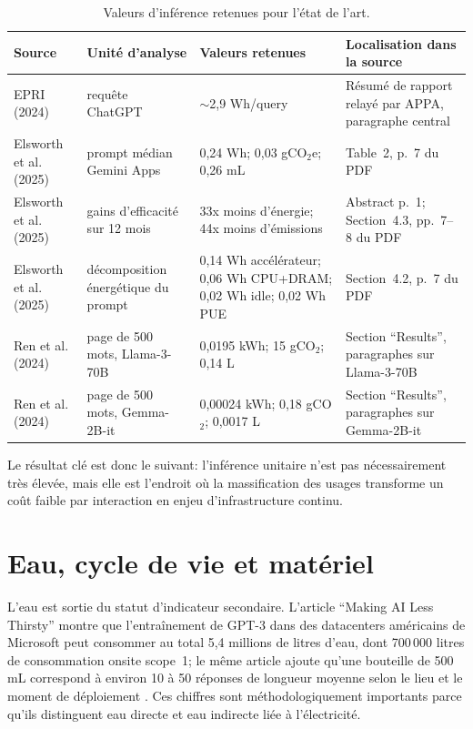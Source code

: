 \documentclass[11pt,a4paper]{article}
\begin{document}
\begin{table}[htbp]
\centering
\small
\begin{tabularx}{\textwidth}{|L{3.3cm}|L{2.3cm}|L{2.7cm}|Y|}
\hline
Source & Unité d'analyse & Valeurs retenues & Localisation dans la source \\
\hline
EPRI (2024) \cite{epri2024} & requête ChatGPT & $\sim$2,9 Wh/query & Résumé de rapport relayé par APPA, paragraphe central \\
\hline
Elsworth et al. (2025) \cite{elsworth2025} & prompt médian Gemini Apps & 0,24 Wh; 0,03 gCO$_2$e; 0,26 mL & Table~2, p.~7 du PDF \\
\hline
Elsworth et al. (2025) \cite{elsworth2025} & gains d'efficacité sur 12 mois & 33x moins d'énergie; 44x moins d'émissions & Abstract p.~1; Section~4.3, pp.~7--8 du PDF \\
\hline
Elsworth et al. (2025) \cite{elsworth2025} & décomposition énergétique du prompt & 0,14 Wh accélérateur; 0,06 Wh CPU+DRAM; 0,02 Wh idle; 0,02 Wh PUE & Section~4.2, p.~7 du PDF \\
\hline
Ren et al. (2024) \cite{ren2024} & page de 500 mots, Llama-3-70B & 0,0195 kWh; 15 gCO$_2$; 0,14 L & Section ``Results'', paragraphes sur Llama-3-70B \\
\hline
Ren et al. (2024) \cite{ren2024} & page de 500 mots, Gemma-2B-it & 0,00024 kWh; 0,18 gCO$_2$; 0,0017 L & Section ``Results'', paragraphes sur Gemma-2B-it \\
\hline
\end{tabularx}
\caption{Valeurs d'inférence retenues pour l'état de l'art.}
\label{tab:inference}
\end{table}

Le résultat clé est donc le suivant: l'inférence unitaire n'est pas nécessairement très élevée, mais elle est l'endroit où la massification des usages transforme un coût faible par interaction en enjeu d'infrastructure continu.

\section{Eau, cycle de vie et matériel}
L'eau est sortie du statut d'indicateur secondaire. L'article ``Making AI Less Thirsty'' montre que l'entraînement de GPT-3 dans des datacenters américains de Microsoft peut consommer au total 5,4 millions de litres d'eau, dont 700\,000 litres de consommation onsite scope~1; le même article ajoute qu'une bouteille de 500 mL correspond à environ 10 à 50 réponses de longueur moyenne selon le lieu et le moment de déploiement \cite{li2025water}. Ces chiffres sont méthodologiquement importants parce qu'ils distinguent eau directe et eau indirecte liée à l'électricité.
\end{document}
